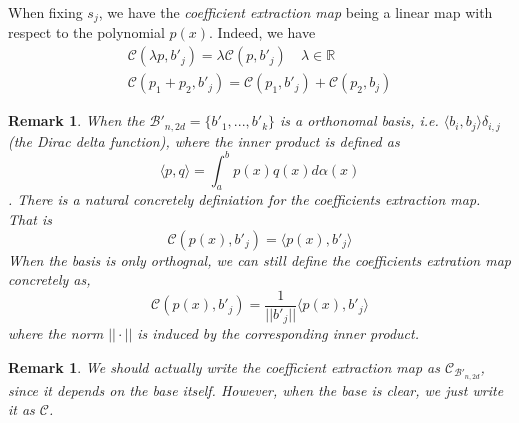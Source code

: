 \documentclass[12pt]{amsart}
\numberwithin{equation}{section}
\newtheorem{remark}[thm]{Remark}
\theoremstyle{definition}
\numberwithin{thm}{section}
\begin{document}
\smallskip
When fixing $s_j$, we have the \emph{coefficient extraction map} being a linear map with respect to the polynomial $p(x)$. Indeed, we have 
\begin{equation}
     \begin{split}
          \mathcal{C}(\lambda p, b'_j) = \lambda \mathcal{C}(p, b'_j) \quad \lambda \in \mathbb{R}
          \\
          \mathcal{C}(p_1 + p_2, b'_j) = \mathcal{C}(p_1, b'_j) + \mathcal{C}(p_2, b_j)
     \end{split}
\end{equation}

\begin{remark}
     When the $\mathcal{B'}_{n, 2d} = \{b'_1,... ,b'_k\}$ is a orthonomal basis, i.e. $\langle b_i, b_j \rangle \delta_{i,j}$ (the Dirac delta function), where the inner product is defined as
     \begin{equation} 
          \langle p, q \rangle = \int_a^b p(x) q(x) d\alpha(x)
     \end{equation}. 
     There is a natural concretely definiation for the \emph{coefficients extraction map}. 
     That is
     \begin{equation}
          \mathcal{C}(p(x), b'_j) = \langle p(x), b'_j \rangle
     \end{equation}
     When the basis is only orthognal, we can still define the \emph{coefficients extration map} concretely as,
     \begin{equation}
          \mathcal{C}(p(x), b'_j) = \frac{1}{||b'_j||}\langle p(x), b'_j \rangle 
     \end{equation}
     where the norm $|| \cdot ||$ is induced by the corresponding inner product.
\end{remark}

\begin{remark}
     We should actually write the \emph{coefficient extraction map} as $\mathcal{C}_{\mathcal{B'}_{n,2d}}$,
     since it depends on the base itself. However, when the base is clear, we just write it as $\mathcal{C}$.
\end{remark}
\end{document}
